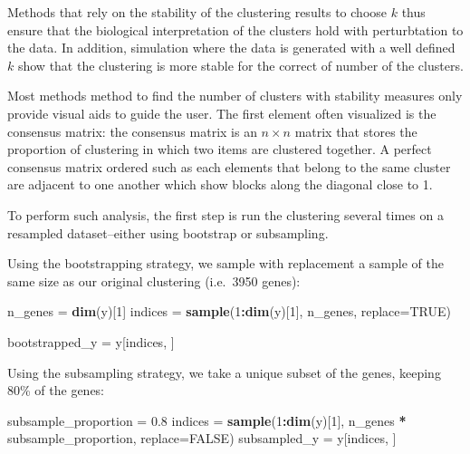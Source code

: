 \documentclass[9pt,a4paper,]{extarticle}
\newenvironment{Shaded}{\begin{snugshade}}{\end{snugshade}}
\newcommand{\DataTypeTok}[1]{\textcolor[rgb]{0.13,0.29,0.53}{#1}}
\newcommand{\DecValTok}[1]{\textcolor[rgb]{0.00,0.00,0.81}{#1}}
\newcommand{\FloatTok}[1]{\textcolor[rgb]{0.00,0.00,0.81}{#1}}
\newcommand{\KeywordTok}[1]{\textcolor[rgb]{0.13,0.29,0.53}{\textbf{#1}}}
\newcommand{\NormalTok}[1]{#1}
\newcommand{\OperatorTok}[1]{\textcolor[rgb]{0.81,0.36,0.00}{\textbf{#1}}}
\newcommand{\OtherTok}[1]{\textcolor[rgb]{0.56,0.35,0.01}{#1}}
\newcommand{\StringTok}[1]{\textcolor[rgb]{0.31,0.60,0.02}{#1}}
\begin{document}
Methods that rely on the stability of the clustering results to choose \(k\)
thus ensure that the biological interpretation of the clusters hold with
perturbtation to the data. In addition, simulation where the data is generated
with a well defined \(k\) show that the clustering is more stable for the
correct of number of the clusters.

Most methods method to find the number of clusters with stability measures
only provide visual aids to guide the user. The first element often visualized
is the consensus matrix: the consensus matrix is an \(n \times n\) matrix that
stores the proportion of clustering in which two items are clustered together.
A perfect consensus matrix ordered such as each elements that belong to the
same cluster are adjacent to one another which show blocks along the diagonal
close to 1.

To perform such analysis, the first step is run the clustering several times
on a resampled dataset--either using bootstrap or subsampling.

Using the bootstrapping strategy, we sample with replacement a sample of the
same size as our original clustering (i.e.~3950 genes):

\begin{Shaded}
\begin{Highlighting}[]
\NormalTok{n_genes =}\StringTok{ }\KeywordTok{dim}\NormalTok{(y)[}\DecValTok{1}\NormalTok{]}
\NormalTok{indices =}\StringTok{ }\KeywordTok{sample}\NormalTok{(}\DecValTok{1}\OperatorTok{:}\KeywordTok{dim}\NormalTok{(y)[}\DecValTok{1}\NormalTok{], n_genes, }\DataTypeTok{replace=}\OtherTok{TRUE}\NormalTok{)}

\NormalTok{bootstrapped_y =}\StringTok{ }\NormalTok{y[indices, ]}
\end{Highlighting}
\end{Shaded}

Using the subsampling strategy, we take a unique subset of the genes, keeping 80\% of the genes:

\begin{Shaded}
\begin{Highlighting}[]
\NormalTok{subsample_proportion =}\StringTok{ }\FloatTok{0.8}
\NormalTok{indices =}\StringTok{ }\KeywordTok{sample}\NormalTok{(}\DecValTok{1}\OperatorTok{:}\KeywordTok{dim}\NormalTok{(y)[}\DecValTok{1}\NormalTok{], n_genes }\OperatorTok{*}\StringTok{ }\NormalTok{subsample_proportion, }\DataTypeTok{replace=}\OtherTok{FALSE}\NormalTok{)}
\NormalTok{subsampled_y =}\StringTok{ }\NormalTok{y[indices, ]}
\end{Highlighting}
\end{Shaded}
\end{document}
